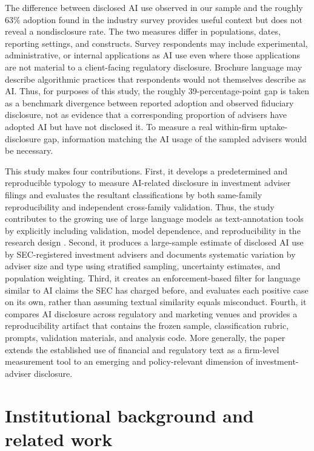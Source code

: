 \documentclass[utf8]{FrontiersinHarvard}
\begin{document}
The difference between disclosed AI use observed in our sample and the roughly 63\% adoption found in the industry survey provides useful context but does not reveal a nondisclosure rate. The two measures differ in populations, dates, reporting settings, and constructs. Survey respondents may include experimental, administrative, or internal applications as AI use even where those applications are not material to a client-facing regulatory disclosure. Brochure language may describe algorithmic practices that respondents would not themselves describe as AI. Thus, for purposes of this study, the roughly 39-percentage-point gap is taken as a benchmark divergence between reported adoption and observed fiduciary disclosure, not as evidence that a corresponding proportion of advisers have adopted AI but have not disclosed it. To measure a real within-firm uptake-disclosure gap, information matching the AI usage of the sampled advisers would be necessary.

This study makes four contributions. First, it develops a predetermined and reproducible typology to measure AI-related disclosure in investment adviser filings and evaluates the resultant classifications by both same-family reproducibility and independent cross-family validation. Thus, the study contributes to the growing use of large language models as text-annotation tools by explicitly including validation, model dependence, and reproducibility in the research design \citep{gilardi2023,tornberg2023,ziems2024,rathje2024,ollion2024}. Second, it produces a large-sample estimate of disclosed AI use by SEC-registered investment advisers and documents systematic variation by adviser size and type using stratified sampling, uncertainty estimates, and population weighting. Third, it creates an enforcement-based filter for language similar to AI claims the SEC has charged before, and evaluates each positive case on its own, rather than assuming textual similarity equals misconduct. Fourth, it compares AI disclosure across regulatory and marketing venues and provides a reproducibility artifact that contains the frozen sample, classification rubric, prompts, validation materials, and analysis code. More generally, the paper extends the established use of financial and regulatory text as a firm-level measurement tool \citep{tetlock2007,loughran2011,hoberg2016,cohenLazy2020,abis2022} to an emerging and policy-relevant dimension of investment-adviser disclosure.

\section{Institutional background and related work}
\end{document}

